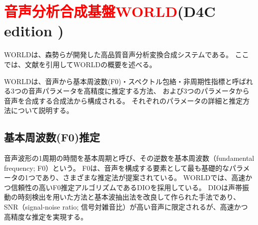 \section{\textcolor{red}{音声分析合成基盤WORLD}\cite{morise2016world}(D4C edition \cite{morise2016worldD4Ce})}
\label{sec:WORLDS}

WORLDは、森勢らが開発した高品質音声分析変換合成システムである。
ここでは、文献\cite{morise2016world,morise2016worldD4Cj,morise2019wasei}を引用してWORLDの概要を述べる。

WORLDは、音声から基本周波数(F0)・スペクトル包絡・非周期性指標と呼ばれる3つの音声パラメータを高精度に推定する方法、
および3つのパラメータから音声を合成する合成法から構成される。
それぞれのパラメータの詳細と推定方法について説明する。

\subsection{基本周波数(F0)推定\cite{morise2016Kihonha}}

音声波形の1周期の時間を基本周期と呼び、その逆数を基本周波数（fundamental frequency; F0）という。
F0は、音声を構成する要素として最も基礎的なパラメータの1つであり、さまざまな推定法が提案されている。
WORLDでは、高速かつ信頼性の高いF0推定アルゴリズムであるDIO\cite{yegnana2009DIO}を採用している。
DIOは声帯振動の時刻検出を用いた方法と基本波抽出法を改良して作られた手法であり、
SNR（signal-noise ratio; 信号対雑音比）が高い音声に限定されるが、高速かつ高精度な推定を実現する\cite{morise2016Kihonha}。

